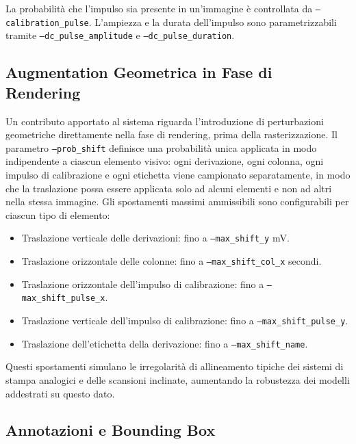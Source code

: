 La probabilità che l'impulso sia presente in un'immagine è controllata da \texttt{--calibration\_pulse}. L'ampiezza e la durata dell'impulso sono parametrizzabili tramite \texttt{--dc\_pulse\_amplitude} e \texttt{--dc\_pulse\_duration}.

\subsection{Augmentation Geometrica in Fase di Rendering}

Un contributo apportato al sistema riguarda l'introduzione di perturbazioni geometriche direttamente nella fase di rendering, prima della rasterizzazione. Il parametro \texttt{--prob\_shift} definisce una probabilità unica applicata in modo indipendente a ciascun elemento visivo: ogni derivazione, ogni colonna, ogni impulso di calibrazione e ogni etichetta viene campionato separatamente, in modo che la traslazione possa essere applicata solo ad alcuni elementi e non ad altri nella stessa immagine. Gli spostamenti massimi ammissibili sono configurabili per ciascun tipo di elemento:

\begin{itemize}
    \item Traslazione verticale delle derivazioni: fino a \texttt{--max\_shift\_y} mV.
    \item Traslazione orizzontale delle colonne: fino a \texttt{--max\_shift\_col\_x} secondi.
    \item Traslazione orizzontale dell'impulso di calibrazione: fino a \texttt{--max\_shift\_\allowbreak{}pulse\_x}.
    \item Traslazione verticale dell'impulso di calibrazione: fino a \texttt{--max\_shift\_pulse\_y}.
    \item Traslazione dell'etichetta della derivazione: fino a \texttt{--max\_shift\_name}.
\end{itemize}

Questi spostamenti simulano le irregolarità di allineamento tipiche dei sistemi di stampa analogici e delle scansioni inclinate, aumentando la robustezza dei modelli addestrati su questo dato.

\subsection{Annotazioni e Bounding Box}

